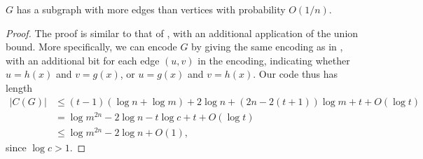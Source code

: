 %

\begin{lem}
  $G$ has a subgraph with more edges than vertices with probability
  $O(1/n)$.
\end{lem}
\begin{proof}
  The proof is similar to that of , with an
  additional application of the union bound. More specifically, we can
  encode $G$ by giving the same encoding as in
  , with an additional bit for each edge
  $(u, v)$ in the encoding, indicating whether $u = h(x)$ and
  $v = g(x)$, or $u = g(x)$ and $v = h(x)$. Our code thus has length
  \begin{align*}
    |C(G)| &\le (t - 1)(\log n + \log m) + 2 \log n + (2n - 2(t + 1))\log m + t + O(\log t) \\
           &= \log m^{2n} - 2 \log n - t \log c + t + O(\log t) \\
           &\le \log m^{2n} - 2 \log n + O(1) ,
  \end{align*}
  since $\log c > 1$.
\end{proof}


